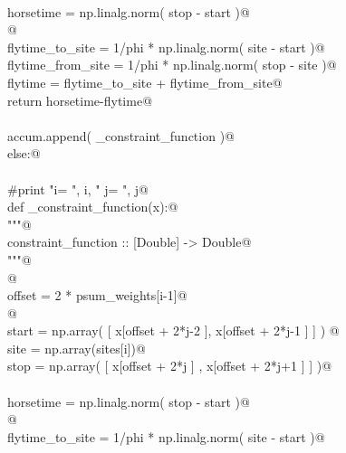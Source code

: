 \documentclass[11.5pt]{report}
\begin{document}
\begin{flushleft}
\begin{list}{}{}
\mbox{}\verb@@\\
\mbox{}\verb@                          horsetime = np.linalg.norm( stop - start )@\\
\mbox{}\verb@                          @\\
\mbox{}\verb@                          flytime_to_site   = 1/phi * np.linalg.norm( site - start )@\\
\mbox{}\verb@                          flytime_from_site = 1/phi * np.linalg.norm( stop - site  )@\\
\mbox{}\verb@                          flytime           = flytime_to_site + flytime_from_site@\\
\mbox{}\verb@                          return horsetime-flytime@\\
\mbox{}\verb@@\\
\mbox{}\verb@                    accum.append( _constraint_function )@\\
\mbox{}\verb@              else:@\\
\mbox{}\verb@@\\
\mbox{}\verb@                    #print "i= ", i, " j= ", j@\\
\mbox{}\verb@                    def _constraint_function(x):@\\
\mbox{}\verb@                          """@\\
\mbox{}\verb@                          constraint_function :: [Double] -> Double@\\
\mbox{}\verb@                          """@\\
\mbox{}\verb@                          @\\
\mbox{}\verb@                          offset = 2 * psum_weights[i-1]@\\
\mbox{}\verb@                          @\\
\mbox{}\verb@                          start  = np.array( [ x[offset + 2*j-2 ], x[offset + 2*j-1 ] ] ) @\\
\mbox{}\verb@                          site   = np.array(sites[i])@\\
\mbox{}\verb@                          stop   = np.array( [ x[offset + 2*j ]  , x[offset + 2*j+1 ] ] )@\\
\mbox{}\verb@@\\
\mbox{}\verb@                          horsetime = np.linalg.norm( stop - start )@\\
\mbox{}\verb@                          @\\
\mbox{}\verb@                          flytime_to_site   = 1/phi * np.linalg.norm( site - start )@\\

\end{list}
\end{flushleft}
\end{document}
